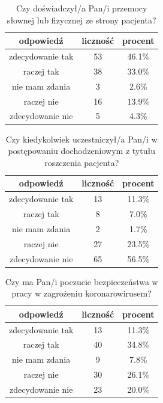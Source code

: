 \documentclass[a4paper,12pt,twoside,openany]{report}
\begin{document}
\begin{table}[h]
\caption{Czy doświadczył/a Pan/i przemocy słownej lub fizycznej ze strony pacjenta?}
\centering
\begin{tabular}{ | c | c | c |}
\hline
odpowiedź & liczność & procent\\
\hline
zdecydowanie tak  &  53  & 46.1\% \\
\hline
raczej tak  &  38  & 33.0\% \\
\hline
nie mam zdania  &  3  & 2.6\% \\
\hline
raczej nie  &  16  & 13.9\% \\
\hline
zdecydowanie nie  &  5  & 4.3\% \\
\hline
\end{tabular}
\label{tab:Q16}
\end{table}



\begin{table}[h]
\caption{Czy kiedykolwiek uczestniczył/a Pan/i w postępowaniu dochodzeniowym z tytułu roszczenia pacjenta?}
\centering
\begin{tabular}{ | c | c | c |}
\hline
odpowiedź & liczność & procent\\
\hline
zdecydowanie tak  &  13  & 11.3\% \\
\hline
raczej tak  &  8  & 7.0\% \\
\hline
nie mam zdania  &  2  & 1.7\% \\
\hline
raczej nie  &  27  & 23.5\% \\
\hline
zdecydowanie nie  &  65  & 56.5\% \\
\hline
\end{tabular}
\label{tab:Q17}
\end{table}



\begin{table}[h]
\caption{Czy ma Pan/i poczucie bezpieczeństwa w pracy w zagrożeniu koronarowirusem?}
\centering
\begin{tabular}{ | c | c | c |}
\hline
odpowiedź & liczność & procent\\
\hline
zdecydowanie tak  &  13  & 11.3\% \\
\hline
raczej tak  &  40  & 34.8\% \\
\hline
nie mam zdania  &  9  & 7.8\% \\
\hline
raczej nie  &  30  & 26.1\% \\
\hline
zdecydowanie nie  &  23  & 20.0\% \\
\hline
\end{tabular}
\label{tab:Q18}
\end{table}
\end{document}
